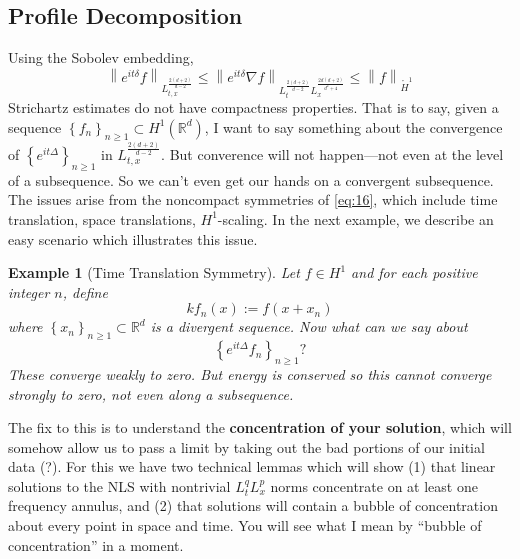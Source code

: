 \documentclass{article}
\newtheorem{example}{Example}
\def\R{\mathbb{R}} %
\newcommand\norm[1]{\left\lVert#1\right\rVert}
\begin{document}
\subsection{Profile Decomposition}
Using the Sobolev embedding,
\begin{equation}\label{eq:16}
  \norm{e^{it\delta}f}_{L_{t,x}^{\frac{2(d+2)}{d-2}}}
  \leq
  \norm{e^{it\delta}\nabla f}_{L_{t}^{\frac{2(d+2)}{d-2}}L_{x}^{\frac{2d(d+2)}{d^{2}+4}}}
  \leq
  \norm{f}_{\mathring{H}^{1}}
\end{equation}
Strichartz estimates do not have compactness properties. That is to say, given
a sequence $\left\{f_{n}\right\}_{n \geq 1}\subset H^{1}(\R^d)$, I want to say something
about the convergence of $\left\{e^{it\Delta}\right\}_{n \geq 1}$  in
$L_{t,x}^{\frac{2(d+2)}{d-2}}$. But converence will not happen---not even at
the level of a subsequence. So we can't even get our hands on a convergent
subsequence. The issues arise from the noncompact symmetries of \cref{eq:16},
which include time translation, space translations, $H^{1}$-scaling. In the
next example, we describe an easy scenario which illustrates this issue.
\begin{example}[Time Translation Symmetry]
  \label{ex:time-translation}
  Let $f\in H^{1}$ and for each positive integer $n$, define
  \begin{equation*}k
    f_{n}(x) := f(x+x_{n})
  \end{equation*}
  where $\left\{x_{n}\right\}_{n \geq 1}\subset \R^d$ is a divergent sequence.
  Now what can we say about
  \begin{equation*}
    \left\{e^{it\Delta}f_{n}\right\}_{n \geq 1}?
  \end{equation*}
  These converge weakly to zero. But energy is conserved so this cannot
  converge strongly to zero, not even along a subsequence.
\end{example}

The fix to this is to understand the \textbf{concentration of your solution},
which will somehow allow us to pass a limit by taking out the bad portions of
our initial data (?). For this we have two technical lemmas which will show (1)
that linear solutions to the NLS with nontrivial $L^{q}_{t}L_{x}^{p}$ norms
concentrate on at least one frequency annulus, and (2) that solutions will
contain a bubble of concentration about every point in space and time. You will
see what I mean by ``bubble of concentration'' in a moment.
\end{document}
